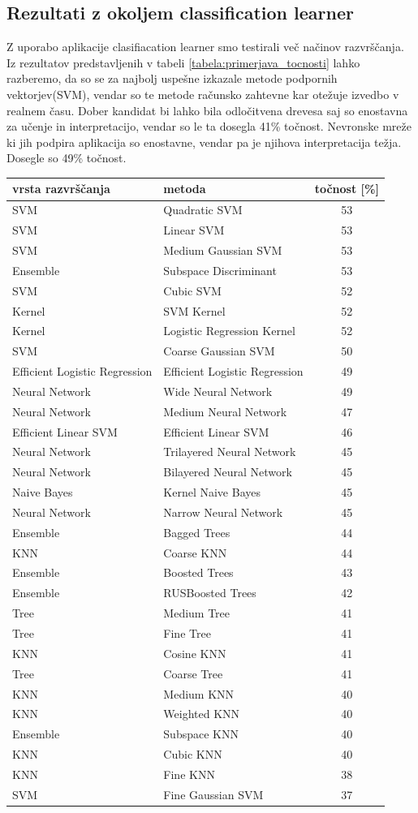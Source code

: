 \subsection{Rezultati z okoljem classification learner}
Z uporabo aplikacije clasifiacation learner smo testirali več načinov razvrščanja. Iz rezultatov predstavljenih v tabeli \ref{tabela:primerjava_tocnosti} lahko razberemo, da so se za najbolj uspešne izkazale metode podpornih vektorjev(SVM), vendar so te metode računsko zahtevne kar otežuje izvedbo v realnem času. Dober kandidat bi lahko bila odločitvena drevesa saj so enostavna za učenje in interpretacijo, vendar so le ta dosegla 41\% točnost. Nevronske mreže ki jih podpira aplikacija so enostavne, vendar pa je njihova interpretacija težja. Dosegle so 49\% točnost.
\begin{table}
\centering
\begin{tabular}{|l|l|c|}
\hline
vrsta razvrščanja & metoda & točnost [\%] \\
\hline SVM&Quadratic SVM&53\\
\hline SVM&Linear SVM&53\\
\hline SVM&Medium Gaussian SVM&53\\
\hline Ensemble&Subspace Discriminant&53\\
\hline SVM&Cubic SVM&52\\
\hline Kernel&SVM Kernel&52\\
\hline Kernel&Logistic Regression Kernel&52\\
\hline SVM&Coarse Gaussian SVM&50\\
\hline Efficient Logistic Regression&Efficient Logistic Regression&49\\
\hline Neural Network&Wide Neural Network&49\\
\hline Neural Network&Medium Neural Network&47\\
\hline Efficient Linear SVM&Efficient Linear SVM&46\\
\hline Neural Network&Trilayered Neural Network&45\\
\hline Neural Network&Bilayered Neural Network&45\\
\hline Naive Bayes&Kernel Naive Bayes&45\\
\hline Neural Network&Narrow Neural Network&45\\
\hline Ensemble&Bagged Trees&44\\
\hline KNN&Coarse KNN&44\\
\hline Ensemble&Boosted Trees&43\\
\hline Ensemble&RUSBoosted Trees&42\\
\hline Tree&Medium Tree&41\\
\hline Tree&Fine Tree&41\\
\hline KNN&Cosine KNN&41\\
\hline Tree&Coarse Tree&41\\
\hline KNN&Medium KNN&40\\
\hline KNN&Weighted KNN&40\\
\hline Ensemble&Subspace KNN&40\\
\hline KNN&Cubic KNN&40\\
\hline KNN&Fine KNN&38\\
\hline SVM&Fine Gaussian SVM&37\\


\end{tabular}
\end{table}
